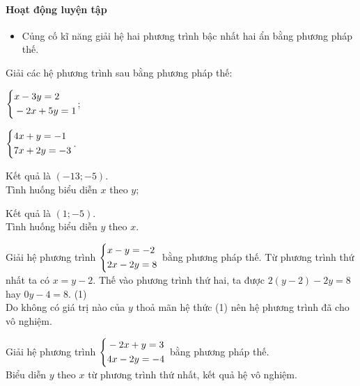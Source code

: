 \paragraph{Hoạt động luyện tập}

\muctieu

\begin{itemize}
    \item Củng cố kĩ năng giải hệ hai phương trình bậc nhất hai ẩn bằng phương pháp thế.
\end{itemize}

\noidungsanpham

\begin{luyentap}
    Giải các hệ phương trình sau bằng phương pháp thế:
    \begin{listEX}
        \item $\left\{\begin{aligned}&x - 3y = 2 \\ &-2x + 5y = 1\end{aligned}\right.$;
        \item $\left\{\begin{aligned}&4x + y = -1 \\ &7x + 2y = -3\end{aligned}\right.$.
    \end{listEX}
    \doicot
    \huongdan
    \begin{listEX}
        \item Kết quả là $(-13 ; -5)$.\\
        Tình huống biểu diễn $x$ theo $y$; 
        \item Kết quả là $(1 ; -5)$.\\
        Tình huống biểu diễn $y$ theo $x$. 
    \end{listEX}
\end{luyentap}

\begin{vidu}
    Giải hệ phương trình $\left\{\begin{aligned}&x - y = -2 \\ &2x - 2y = 8\end{aligned}\right.$ bằng phương pháp thế.
    \doicot
    Từ phương trình thứ nhất ta có $x = y - 2$. Thế vào phương trình thứ hai, ta được $2(y - 2) - 2y = 8$ hay $0y - 4 = 8$. \quad (1)\\
    Do không có giá trị nào của $y$ thoả mãn hệ thức (1) nên hệ phương trình đã cho vô nghiệm.
\end{vidu}

\begin{luyentap}
    Giải hệ phương trình $\left\{\begin{aligned}&-2x + y = 3 \\ &4x - 2y = -4\end{aligned}\right.$ bằng phương pháp thế.
    \doicot
    \huongdan\\
    Biểu diễn $y$ theo $x$ từ phương trình thứ nhất, kết quả hệ vô nghiệm.
\end{luyentap}

